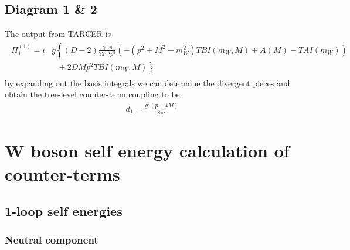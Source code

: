 \documentclass[11pt]{article}
\newcommand{\tarcer}{\textsf{TARCER} \! }
\begin{document}
\subsection{Diagram 1 \& 2}

The output from \tarcer is 
\begin{align}
\begin{split}
\Pi^{(1)}_1 =i &g\left\{ (D-2)\frac{ \gamma\cdot p}{32\pi^4 p^2} \left(- \left(p^2+M^2-m_W^2\right)TBI(m_W,M)+A(M)-TAI(m_W)\right)\right.\\
&\left. \ \ \ + 2D M p^2 TBI(m_W,M)\right\}
\end{split}
\end{align}
by expanding out the basis integrals we can determine the divergent pieces and obtain the tree-level counter-term coupling to be
\begin{align}
d_1 = \frac{g^2 (p-4M)}{8\pi^2}
\end{align}

\section{W boson self energy calculation of counter-terms}







\subsection{1-loop self energies}
\subsubsection{Neutral component}
\end{document}
